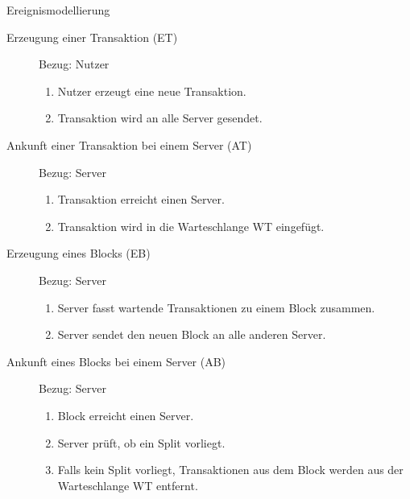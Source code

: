 \documentclass{article}
\begin{document}
\begin{exercise}{Ereignismodellierung}
\begin{enumerate}
\begin{solution}
\begin{minipage}{.4\textwidth}
            \end{minipage}
            \hfill
            \begin{minipage}{.6\textwidth}
              \begin{description}
                \item[Erzeugung einer Transaktion (ET)] Bezug: Nutzer
                      \begin{enumerate}
                        \item Nutzer erzeugt eine neue Transaktion.
                        \item Transaktion wird an alle Server gesendet.
                      \end{enumerate}
                \item[Ankunft einer Transaktion bei einem Server (AT)] Bezug: Server
                      \begin{enumerate}
                        \item Transaktion erreicht einen Server.
                        \item Transaktion wird in die Warteschlange WT eingefügt.
                      \end{enumerate}
                \item[Erzeugung eines Blocks (EB)] Bezug: Server
                      \begin{enumerate}
                        \item Server fasst wartende Transaktionen zu einem Block zusammen.
                        \item Server sendet den neuen Block an alle anderen Server.
                      \end{enumerate}
                \item[Ankunft eines Blocks bei einem Server (AB)] Bezug: Server
                      \begin{enumerate}
                        \item Block erreicht einen Server.
                        \item Server prüft, ob ein Split vorliegt.
                        \item Falls kein Split vorliegt, Transaktionen aus dem Block werden aus der Warteschlange WT entfernt.

\end{enumerate}
\end{description}
\end{minipage}
\end{solution}
\end{enumerate}
\end{exercise}
\end{document}
